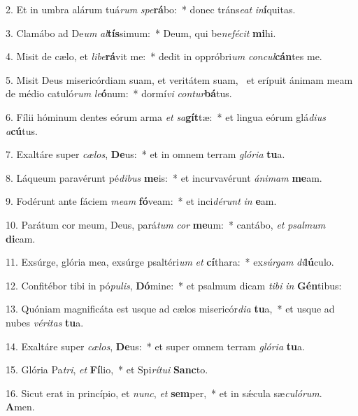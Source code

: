 2. Et in umbra alárum tuá\textit{rum} \textit{spe}\textbf{rá}bo:~*  donec tráns\textit{e}\textit{at} \textit{in}\textbf{í}quitas.\

3. Clamábo ad De\textit{um} \textit{al}\textbf{tís}simum:~*  Deum, qui be\textit{ne}\textit{fé}\textit{cit} \textbf{mi}hi.\

4. Misit de cælo, et \textit{li}\textit{be}\textbf{rá}vit me:~*  dedit in oppróbri\textit{um} \textit{con}\textit{cul}\textbf{cán}tes me.\

5. Misit Deus misericórdiam suam, et veritátem suam, \dag\  et erípuit ánimam meam de médio catuló\textit{rum} \textit{le}\textbf{ó}num:~*  dormí\textit{vi} \textit{con}\textit{tur}\textbf{bá}tus.\

6. Fílii hóminum dentes eórum arma \textit{et} \textit{sa}\textbf{gít}tæ:~*  et lingua eórum glá\textit{di}\textit{us} \textit{a}\textbf{cú}tus.\

7. Exaltáre super \textit{cæ}\textit{los}, \textbf{De}us:~*  et in omnem terram \textit{gló}\textit{ri}\textit{a} \textbf{tu}a.\

8. Láqueum paravérunt pé\textit{di}\textit{bus} \textbf{me}is:~*  et incurvavérunt \textit{á}\textit{ni}\textit{mam} \textbf{me}am.\

9. Fodérunt ante fáciem \textit{me}\textit{am} \textbf{fó}veam:~*  et inci\textit{dé}\textit{runt} \textit{in} \textbf{e}am.\

10. Parátum cor meum, Deus, pará\textit{tum} \textit{cor} \textbf{me}um:~*  cantábo, \textit{et} \textit{psal}\textit{mum} \textbf{di}cam.\

11. Exsúrge, glória mea, exsúrge psaltéri\textit{um} \textit{et} \textbf{cí}thara:~*  ex\textit{súr}\textit{gam} \textit{di}\textbf{lú}culo.\

12. Confitébor tibi in pó\textit{pu}\textit{lis}, \textbf{Dó}mine:~*  et psalmum dicam \textit{ti}\textit{bi} \textit{in} \textbf{Gén}tibus:\

13. Quóniam magnificáta est usque ad cælos misericór\textit{di}\textit{a} \textbf{tu}a,~*  et usque ad nubes \textit{vé}\textit{ri}\textit{tas} \textbf{tu}a.\

14. Exaltáre super \textit{cæ}\textit{los}, \textbf{De}us:~*  et super omnem terram \textit{gló}\textit{ri}\textit{a} \textbf{tu}a.\

15. Glória Pa\textit{tri}, \textit{et} \textbf{Fí}lio,~*  et Spi\textit{rí}\textit{tu}\textit{i} \textbf{Sanc}to.\

16. Sicut erat in princípio, et \textit{nunc}, \textit{et} \textbf{sem}per,~*  et in sǽcula sæ\textit{cu}\textit{ló}\textit{rum}. \textbf{A}men.\


